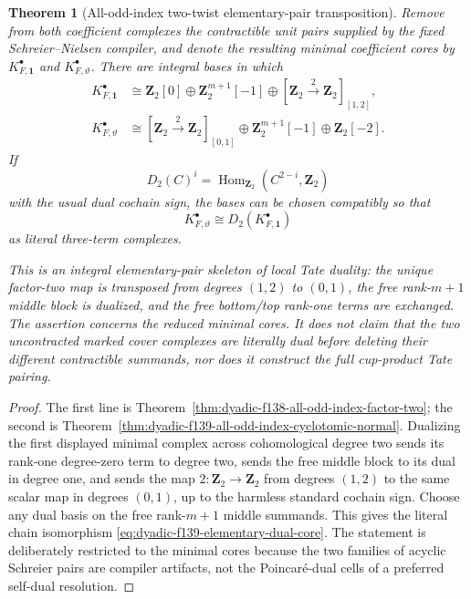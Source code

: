 \documentclass[11pt]{article}
\newtheorem{theorem}{Theorem}[section]
\theoremstyle{definition}
\begin{document}
\begin{theorem}[All-odd-index two-twist elementary-pair transposition]
\label{thm:dyadic-f139-two-twist-transposition}
Remove from both coefficient complexes the
contractible unit pairs supplied by the fixed
Schreier--Nielsen compiler, and denote the resulting
minimal coefficient cores by
$K_{F,\mathbf1}^\bullet$ and
$K_{F,\vartheta}^\bullet$.
There are integral bases in which
\begin{equation}\label{eq:dyadic-f139-two-minimal-cores}
\boxed{
\begin{aligned}
K_{F,\mathbf1}^\bullet
&\cong
\mathbf Z_2[0]\oplus\mathbf Z_2^{m+1}[-1]
\oplus[\mathbf Z_2\xrightarrow{\ 2\ }\mathbf Z_2]_{[1,2]},\\
K_{F,\vartheta}^\bullet
&\cong
[\mathbf Z_2\xrightarrow{\ 2\ }\mathbf Z_2]_{[0,1]}
\oplus\mathbf Z_2^{m+1}[-1]\oplus\mathbf Z_2[-2].
\end{aligned}}
\end{equation}
If
\[
D_2(C)^i=\operatorname{Hom}_{\mathbf Z_2}
(C^{2-i},\mathbf Z_2)
\]
with the usual dual cochain sign, the bases can be
chosen compatibly so that
\begin{equation}\label{eq:dyadic-f139-elementary-dual-core}
\boxed{\qquad
K_{F,\vartheta}^\bullet
\cong D_2(K_{F,\mathbf1}^\bullet)
\qquad}
\end{equation}
as literal three-term complexes.

This is an integral \emph{elementary-pair skeleton}
of local Tate duality: the unique factor-two map is
transposed from degrees $(1,2)$ to $(0,1)$, the
free rank-$m+1$ middle block is dualized, and the
free bottom/top rank-one terms are exchanged.
The assertion concerns the reduced minimal cores.
It does not claim that the two uncontracted marked
cover complexes are literally dual before deleting
their different contractible summands, nor does it
construct the full cup-product Tate pairing.
\end{theorem}

\begin{proof}
The first line is
Theorem~\ref{thm:dyadic-f138-all-odd-index-factor-two};
the second is
Theorem~\ref{thm:dyadic-f139-all-odd-index-cyclotomic-normal}.
Dualizing the first displayed minimal complex across
cohomological degree two sends its rank-one degree-zero
term to degree two, sends the free middle block to
its dual in degree one, and sends the map
$2:\mathbf Z_2\to\mathbf Z_2$ from degrees $(1,2)$
to the same scalar map in degrees $(0,1)$, up to the
harmless standard cochain sign.  Choose any dual basis
on the free rank-$m+1$ middle summands.
This gives the literal chain isomorphism
\eqref{eq:dyadic-f139-elementary-dual-core}.
The statement is deliberately restricted to the
minimal cores because the two families of acyclic
Schreier pairs are compiler artifacts, not the
Poincar\'e-dual cells of a preferred self-dual
resolution.
\end{proof}
\end{document}
